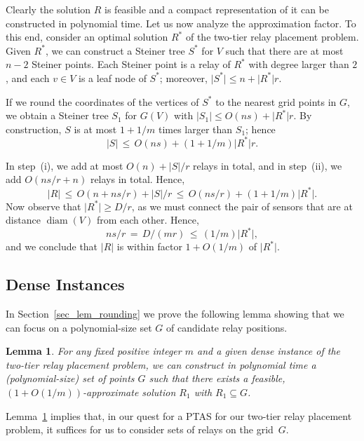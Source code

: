 \documentclass[11pt,a4paper]{article}
\newcommand{\s}[1]{{\lvert #1 \rvert}}
\DeclareMathOperator{\diam}{diam}
\newcommand{\optrel}{R^{*}}
\newtheorem{lemma}{Lemma}
\theoremstyle{definition}
\theoremstyle{remark}
\begin{document}
Clearly the solution $R$ is feasible and a compact representation of it can be constructed in polynomial time. Let us now analyze the approximation factor. To this end, consider an optimal solution $\optrel$ of the two-tier relay placement problem. Given $\optrel$, we can construct a Steiner tree $S^*$ for $V$ such that there are at most $n-2$ Steiner points. Each Steiner point is a relay of $\optrel$ with degree larger than $2$, and each $v \in V$ is a leaf node of $S^*$; moreover, $\s{S^*} \le n + \s{\optrel} r$.

If we round the coordinates of the vertices of $S^*$ to the nearest grid points in $G$, we obtain a Steiner tree $S_1$ for $G(V)$ with $\s{S_1} \le O(ns) + \s{\optrel} r$. By construction, $S$ is at most $1+1/m$ times larger than $S_1$; hence
\[
    \s{S} \,\le\, O(ns) + (1+1/m) \s{\optrel} r .
\]

In step~(i), we add at most $O(n) + \s{S}/r$ relays in total, and in step~(ii), we add $O(ns/r + n)$ relays in total. Hence,
\[
    \s{R} \,\le\, O(n + ns/r) + \s{S}/r \,\le\, O(ns/r) + (1+1/m) \s{\optrel}.
\]
Now observe that $\s{\optrel} \ge D/r$, as we must connect the pair of sensors that are at distance $\diam(V)$ from each other. Hence,
\[
    ns/r \,=\, D/(mr) \,\le\, (1/m) \s{\optrel},
\]
and we conclude that $\s{R}$ is within factor $1 + O(1/m)$ of $\s{\optrel}$.

\subsection{Dense Instances}

In Section~\ref{sec_lem_rounding} we prove the following lemma showing
that we can focus on a polynomial-size set $G$ of candidate relay
positions.

\begin{lemma}\label{lem_rounding}
For any fixed positive integer $m$ and a given dense instance of the
two-tier relay placement problem, we can construct in polynomial time
a (polynomial-size) set of points $G$ such that there exists a
feasible, ${(1+O(1/m))}$-approximate solution $R_1$ with $R_1
\subseteq G$.
\end{lemma}


Lemma~\ref{lem_rounding} implies that, in our quest for a PTAS for our
two-tier relay placement problem, it suffices for us to consider sets
of relays on the grid~$G$.
\end{document}
